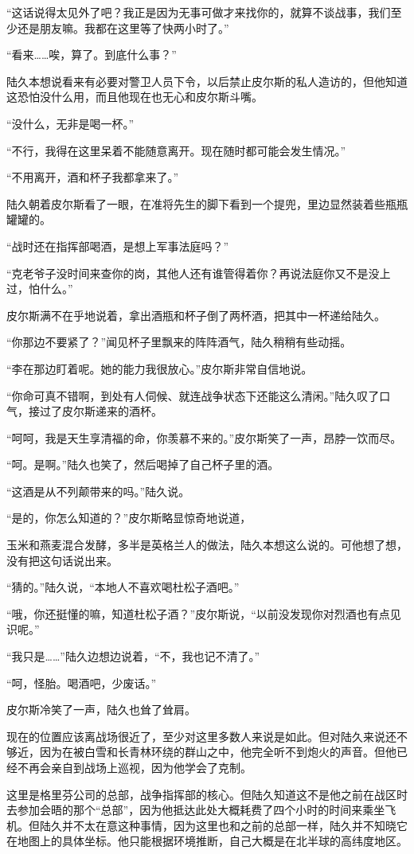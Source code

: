 “这话说得太见外了吧？我正是因为无事可做才来找你的，就算不谈战事，我们至少还是朋友嘛。我都在这里等了快两小时了。”

“看来……唉，算了。到底什么事？”

陆久本想说看来有必要对警卫人员下令，以后禁止皮尔斯的私人造访的，但他知道这恐怕没什么用，而且他现在也无心和皮尔斯斗嘴。

“没什么，无非是喝一杯。”

“不行，我得在这里呆着不能随意离开。现在随时都可能会发生情况。”

“不用离开，酒和杯子我都拿来了。”

陆久朝着皮尔斯看了一眼，在准将先生的脚下看到一个提兜，里边显然装着些瓶瓶罐罐的。

“战时还在指挥部喝酒，是想上军事法庭吗？”

“克老爷子没时间来查你的岗，其他人还有谁管得着你？再说法庭你又不是没上过，怕什么。”

皮尔斯满不在乎地说着，拿出酒瓶和杯子倒了两杯酒，把其中一杯递给陆久。

“你那边不要紧了？”闻见杯子里飘来的阵阵酒气，陆久稍稍有些动摇。

“李在那边盯着呢。她的能力我很放心。”皮尔斯非常自信地说。

“你命可真不错啊，到处有人伺候、就连战争状态下还能这么清闲。”陆久叹了口气，接过了皮尔斯递来的酒杯。

“呵呵，我是天生享清福的命，你羡慕不来的。”皮尔斯笑了一声，昂脖一饮而尽。

“呵。是啊。”陆久也笑了，然后喝掉了自己杯子里的酒。

“这酒是从不列颠带来的吗。”陆久说。

“是的，你怎么知道的？”皮尔斯略显惊奇地说道，

玉米和燕麦混合发酵，多半是英格兰人的做法，陆久本想这么说的。可他想了想，没有把这句话说出来。

“猜的。”陆久说，“本地人不喜欢喝杜松子酒吧。”

“哦，你还挺懂的嘛，知道杜松子酒？”皮尔斯说，“以前没发现你对烈酒也有点见识呢。”

“我只是……”陆久边想边说着，“不，我也记不清了。”

“呵，怪胎。喝酒吧，少废话。”

皮尔斯冷笑了一声，陆久也耸了耸肩。

现在的位置应该离战场很近了，至少对这里多数人来说是如此。但对陆久来说还不够近，因为在被白雪和长青林环绕的群山之中，他完全听不到炮火的声音。但他已经不再会亲自到战场上巡视，因为他学会了克制。

这里是格里芬公司的总部，战争指挥部的核心。但陆久知道这不是他之前在战区时去参加会晤的那个“总部”，因为他抵达此处大概耗费了四个小时的时间来乘坐飞机。但陆久并不太在意这种事情，因为这里也和之前的总部一样，陆久并不知晓它在地图上的具体坐标。他只能根据环境推断，自己大概是在北半球的高纬度地区。


